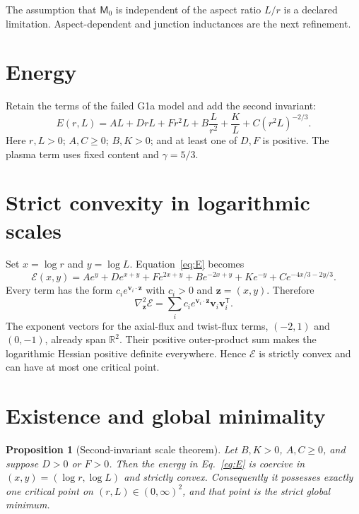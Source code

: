 \documentclass[11pt]{article}
\newtheorem{prop}{Proposition}
\begin{document}
The assumption that $\mathsf M_0$ is independent of the aspect ratio $L/r$ is a
declared limitation. Aspect-dependent and junction inductances are the next
refinement.

\section{Energy}

Retain the terms of the failed G1a model and add the second invariant:
\begin{equation}
E(r,L)=
AL+DrL+Fr^2L+B\frac{L}{r^2}
+\frac{K}{L}
+C(r^2L)^{-2/3}.
\label{eq:E}
\end{equation}
Here $r,L>0$; $A,C\ge0$; $B,K>0$; and at least one of $D,F$ is positive. The plasma
term uses fixed content and $\gamma=5/3$.

\section{Strict convexity in logarithmic scales}

Set $x=\log r$ and $y=\log L$. Equation~\eqref{eq:E} becomes
\[
\mathcal E(x,y)=
Ae^y+De^{x+y}+Fe^{2x+y}+Be^{-2x+y}
+Ke^{-y}+Ce^{-4x/3-2y/3}.
\]
Every term has the form $c_i e^{\mathbf v_i\cdot\mathbf z}$ with $c_i>0$ and
$\mathbf z=(x,y)$. Therefore
\[
\nabla^2_{\mathbf z}\mathcal E
=\sum_i c_ie^{\mathbf v_i\cdot\mathbf z}
\mathbf v_i\mathbf v_i^{\mathsf T}.
\]
The exponent vectors for the axial-flux and twist-flux terms,
$(-2,1)$ and $(0,-1)$, already span $\mathbb R^2$. Their positive outer-product
sum makes the logarithmic Hessian positive definite everywhere. Hence
$\mathcal E$ is strictly convex and can have at most one critical point.

\section{Existence and global minimality}

\begin{prop}[Second-invariant scale theorem]
Let $B,K>0$, $A,C\ge0$, and suppose $D>0$ or $F>0$. Then the energy in
Eq.~\eqref{eq:E} is coercive in $(x,y)=(\log r,\log L)$ and strictly convex.
Consequently it possesses exactly one critical point on $(r,L)\in(0,\infty)^2$,
and that point is the strict global minimum.
\end{prop}
\end{document}
